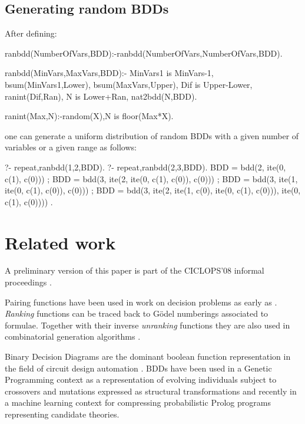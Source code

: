 \documentclass[]{INCLUDES/llncs}
\begin{document}
\subsection{Generating random BDDs}
After defining:
\begin{code}
ranbdd(NumberOfVars,BDD):-ranbdd(NumberOfVars,NumberOfVars,BDD).

ranbdd(MinVars,MaxVars,BDD):-
  MinVars1 is MinVars-1,
  bsum(MinVars1,Lower),
  bsum(MaxVars,Upper),
  Dif is Upper-Lower,
  ranint(Dif,Ran),
  N is Lower+Ran,
  nat2bdd(N,BDD).
  
ranint(Max,N):-random(X),N is floor(Max*X).
\end{code}
one can generate a uniform distribution of random BDDs with a given number of
variables or a given range as follows:
\begin{codex}
?- repeat,ranbdd(1,2,BDD).
?- repeat,ranbdd(2,3,BDD).
BDD = bdd(2, ite(0, c(1), c(0))) ;
BDD = bdd(3, ite(2, ite(0, c(1), c(0)), c(0))) ;
BDD = bdd(3, ite(1, ite(0, c(1), c(0)), c(0))) ;
BDD = bdd(3, ite(2, ite(1, c(0), ite(0, c(1), c(0))), ite(0, c(1), c(0)))) .
\end{codex}


\section{Related work} \label{related}
A preliminary version of this paper is part of the CICLOPS'08 informal
proceedings \cite{ciclops08:pBDD}. 

Pairing functions have been used in work on decision
problems as early as \cite{pepis,kalmar1,robinson50}.
{\em Ranking} functions can be traced back to G\"{o}del numberings
\cite{Goedel:31,conf/icalp/HartmanisB74} associated to formulae. 
Together with their inverse {\em unranking} functions they are also 
used in combinatorial generation
algorithms \cite{conf/mfcs/MartinezM03,knuth06draft}. 

Binary Decision Diagrams are the dominant boolean function representation in
the field of circuit design automation
\cite{DBLP:journals/tcad/DrechslerSF04}.
BDDs have been used in a Genetic Programming context
\cite{DBLP:conf/ices/SakanashiHIK96,DBLP:journals/heuristics/ChenLHW04}
as a representation of evolving individuals subject to crossovers and mutations expressed as
structural transformations and recently in a machine learning context for
compressing probabilistic Prolog programs \cite{DBLP:journals/ml/RaedtKKRT08}
representing candidate theories. 
\end{document}
